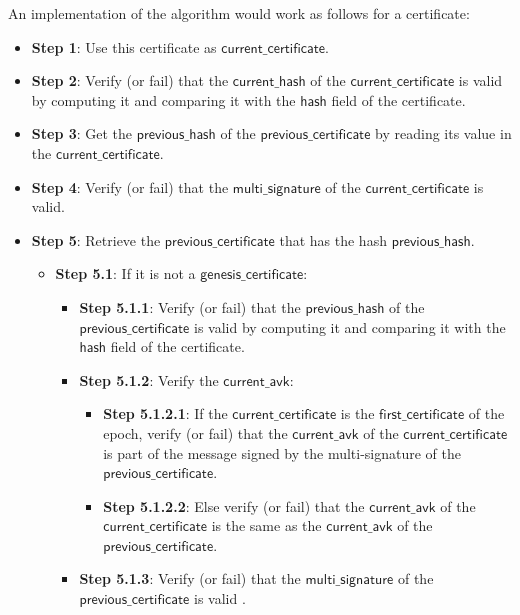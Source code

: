 \documentclass{article}
\begin{document}
An implementation of the algorithm would work as follows for a certificate:
\begin{itemize}
    \item \textbf{Step 1}: Use this certificate as $\mathsf{current\_certificate}$.
    \item \textbf{Step 2}: Verify (or fail) that the $\mathsf{current\_hash}$ of the $\mathsf{current\_certificate}$ is valid by computing it and comparing it with the $\mathsf{hash}$ field of the certificate.
    \item \textbf{Step 3}: Get the $\mathsf{previous\_hash}$ of the $\mathsf{previous\_certificate}$ by reading its value in the $\mathsf{current\_certificate}$.
    \item \textbf{Step 4}: Verify (or fail) that the $\mathsf{multi\_signature}$ of the $\mathsf{current\_certificate}$ is valid.
    \item \textbf{Step 5}: Retrieve the $\mathsf{previous\_certificate}$ that has the hash $\mathsf{previous\_hash}$.
        \begin{itemize}
            \item \textbf{Step 5.1}: If it is not a $\mathsf{genesis\_certificate}$:

            \begin{itemize}
                \item \textbf{Step 5.1.1}: Verify (or fail) that the $\mathsf{previous\_hash}$ of the $\mathsf{previous\_certificate}$ is valid by computing it and comparing it with the $\mathsf{hash}$ field of the certificate.
                \item \textbf{Step 5.1.2}: Verify the $\mathsf{current\_avk}$:

                \begin{itemize}
                    \item \textbf{Step 5.1.2.1}: If the $\mathsf{current\_certificate}$ is the $\mathsf{first\_certificate}$ of the epoch, verify (or fail) that the $\mathsf{current\_avk}$ of the $\mathsf{current\_certificate}$ is part of the message signed by the multi-signature of the $\mathsf{previous\_certificate}$.
                    \item \textbf{Step 5.1.2.2}: Else verify (or fail) that the $\mathsf{current\_avk}$ of the $\mathsf{current\_certificate}$ is the same as the  $\mathsf{current\_avk}$ of the $\mathsf{previous\_certificate}$.
                \end{itemize}

                \item \textbf{Step 5.1.3}: Verify (or fail) that the $\mathsf{multi\_signature}$ of the $\mathsf{previous\_certificate}$ is valid .


\end{itemize}
\end{itemize}
\end{itemize}
\end{document}
